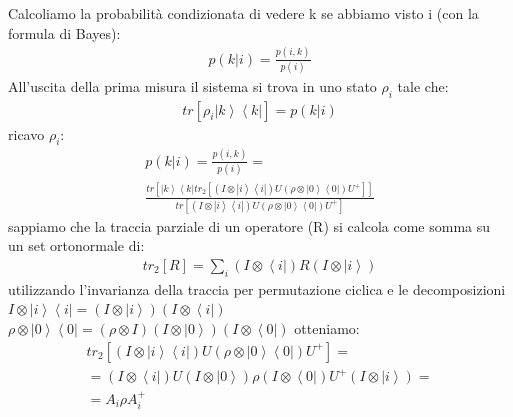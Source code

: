 Calcoliamo la probabilità condizionata di vedere k se abbiamo visto i (con la formula di Bayes):
\begin{equation}\begin{split}
p(k|i)=\frac{p(i,k)}{p(i)}
\end{split}\end{equation}
All'uscita della prima misura il sistema si trova in uno stato $\rho_{i}$ tale che:
\begin{equation}\begin{split}
tr[\rho_{i}\left|k\right\rangle\left\langle k\right|]=p(k|i)
\end{split}\end{equation}
ricavo $\rho_{i}$:
\begin{equation}\begin{split}
p(k|i)=\frac{p(i,k)}{p(i)}=\\
\frac{tr[\left|k\right\rangle\left\langle k\right| tr_{2}[(I\otimes\left|i\right\rangle\left\langle i\right|)U(\rho\otimes\left|0\right\rangle\left\langle 0\right|)U^+]]}{tr[(I\otimes\left|i\right\rangle\left\langle i\right|) U (\rho\otimes\left|0\right\rangle\left\langle 0\right|)U^+]}
\end{split}\end{equation}
sappiamo che la traccia parziale di un operatore (R) si calcola come somma su\\un set ortonormale di:
\begin{equation}\begin{split}
tr_{2}[R]= \sum_{i}(I\otimes\left\langle i\right|)R(I\otimes\left|i\right\rangle)
\end{split}\end{equation}
utilizzando l'invarianza della traccia per permutazione ciclica e le decomposizioni $I\otimes\left|i\right\rangle\left\langle i\right|=(I\otimes\left|i\right\rangle)(I\otimes\left\langle i\right|)$  $\rho\otimes\left|0\right\rangle\left\langle 0\right|=(\rho\otimes I)(I\otimes\left|0\right\rangle)(I\otimes\left\langle0\right|)$ otteniamo:
\begin{equation}\begin{split}
tr_{2}[(I\otimes\left|i\right\rangle\left\langle i\right|)U(\rho\otimes\left|0\right\rangle\left\langle 0\right|)U^+]=\\
=(I\otimes\left\langle i\right|)U(I\otimes\left|0\right\rangle)\rho(I\otimes\left\langle 0\right|)U^+(I\otimes\left|i\right\rangle)= \\
=A_{i}\rho A_{i}^+
\end{split}\end{equation}
